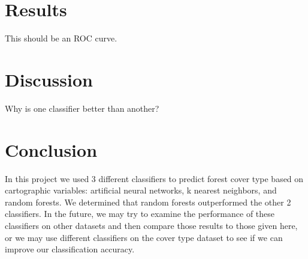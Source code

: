 \documentclass[11pt]{article}
\begin{document}
\section{Results}
This should be an ROC curve.
\section{Discussion}
Why is one classifier better than another?
\section{Conclusion}
In this project we used 3 different classifiers to predict forest cover type based on cartographic variables: artificial neural networks, k nearest neighbors, and random forests. We determined that random forests outperformed the other 2 classifiers. In the future, we may try to examine the performance of these classifiers on other datasets and then compare those results to those given here, or we may use different classifiers on the cover type dataset to see if we can improve our classification accuracy.
\end{document}
